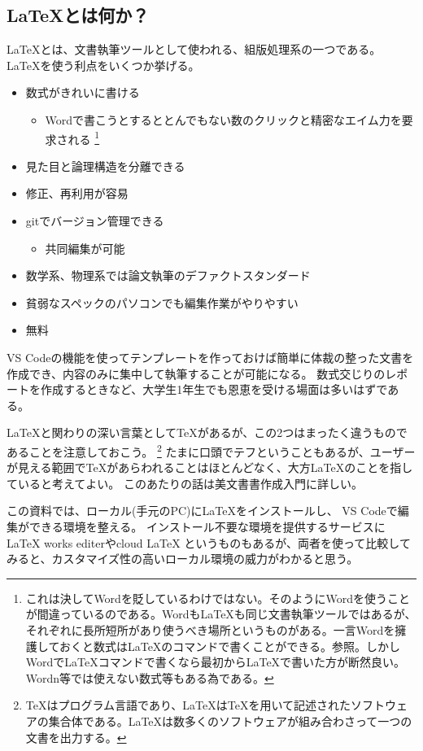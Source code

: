 \documentclass[titlepage]{ltjsarticle}
\begin{document}
\subsection{\LaTeX とは何か？}
\LaTeX とは、文書執筆ツールとして使われる、組版処理系の一つである。
\LaTeX を使う利点をいくつか挙げる。
\begin{itemize}
  \item 数式がきれいに書ける
  \begin{itemize}
    \item Wordで書こうとするととんでもない数のクリックと精密なエイム力を要求される
    \footnote{これは決してWordを貶しているわけではない。そのようにWordを使うことが間違っているのである。Wordも\LaTeX も同じ文書執筆ツールではあるが、それぞれに長所短所があり使うべき場所というものがある。一言Wordを擁護しておくと数式は\LaTeX のコマンドで書くことができる。\cite{WordでLaTeX}参照。しかしWordでLaTeXコマンドで書くなら最初から\LaTeX で書いた方が断然良い。Wordn等では使えない数式等もある為である。}
  \end{itemize}
  \item 見た目と論理構造を分離できる
  \item 修正、再利用が容易
  \item gitでバージョン管理できる
  \begin{itemize}
    \item 共同編集が可能
  \end{itemize}
  \item 数学系、物理系では論文執筆のデファクトスタンダード
  \item 貧弱なスペックのパソコンでも編集作業がやりやすい
  \item 無料
\end{itemize}
VS Codeの機能を使ってテンプレートを作っておけば簡単に体裁の整った文書を作成でき、内容のみに集中して執筆することが可能になる。
数式交じりのレポートを作成するときなど、大学生1年生でも恩恵を受ける場面は多いはずである。

\LaTeX と関わりの深い言葉として\TeX があるが、この2つはまったく違うものであることを注意しておこう。
\footnote{\TeX \index{\TeX}はプログラム言語であり、\LaTeX は\TeX を用いて記述されたソフトウェアの集合体である。\LaTeX は数多くのソフトウェアが組み合わさって一つの文書を出力する。}
たまに口頭でテフということもあるが、ユーザーが見える範囲で\TeX があらわれることはほとんどなく、大方\LaTeX のことを指していると考えてよい。
このあたりの話は美文書書作成入門\cite{美文書本}に詳しい。

この資料では、ローカル(手元のPC)に\LaTeX をインストールし、
VS Codeで編集ができる環境を整える。
インストール不要な環境を提供するサービスにLaTeX works editerやcloud LaTeX というものもあるが、両者を使って比較してみると、カスタマイズ性の高いローカル環境の威力がわかると思う。
\end{document}
